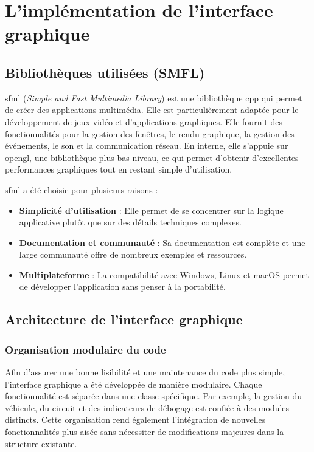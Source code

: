 \section{L'implémentation de l'interface graphique}\label{sec:l'implementation-de-l-interface-graphique}
\subsection{Bibliothèques utilisées (SMFL)}\label{subsec:sfml}
\gls{sfml} (\textit{Simple and Fast Multimedia Library}) est une bibliothèque \gls{cpp} qui permet de créer des applications multimédia.
Elle est particulièrement adaptée pour le développement de jeux vidéo et d'applications graphiques.
Elle fournit des fonctionnalités pour la gestion des fenêtres, le rendu graphique, la gestion des événements, le son et la communication réseau.
En interne, elle s'appuie sur \gls{opengl}, une bibliothèque plus bas niveau, ce qui permet d'obtenir d'excellentes performances graphiques tout en restant simple d'utilisation.

\gls{sfml} a été choisie pour plusieurs raisons :
\begin{itemize}
    \item \textbf{Simplicité d'utilisation} : Elle permet de se concentrer sur la logique applicative plutôt que sur des détails techniques complexes.
    \item \textbf{Documentation et communauté} : Sa documentation\cite{documentationSFML} est complète et une large communauté offre de nombreux exemples et ressources.
    \item \textbf{Multiplateforme} : La compatibilité avec Windows, Linux et macOS permet de développer l'application sans penser à la portabilité.
\end{itemize}

\subsection{Architecture de l'interface graphique}\label{subsec:architecture-de-l-interface-graphique}
\subsubsection{Organisation modulaire du code}\label{subsubsec:organisation-modulaire-du-code}
Afin d'assurer une bonne lisibilité et une maintenance du code plus simple, l'interface graphique a été développée de manière modulaire.
Chaque fonctionnalité est séparée dans une classe spécifique.
Par exemple, la gestion du véhicule, du circuit et des indicateurs de débogage est confiée à des modules distincts.
Cette organisation rend également l'intégration de nouvelles fonctionnalités plus aisée sans nécessiter de modifications majeures dans la structure existante.

